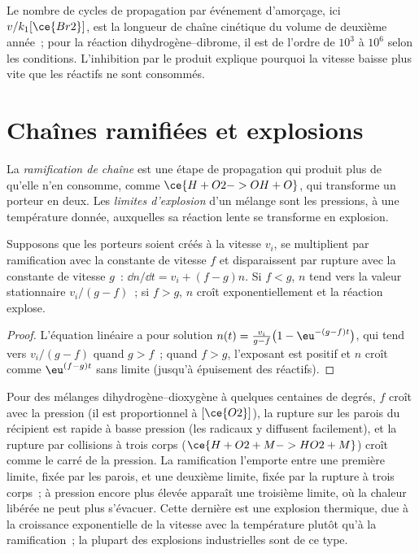 Le nombre de cycles de propagation par événement d'amorçage, ici
$v/k_1[\ce{Br2}]$, est la longueur de chaîne cinétique du volume de
deuxième année~; pour la réaction dihydrogène--dibrome, il est de
l'ordre de $10^3$ à $10^6$ selon les conditions. L'inhibition par le
produit explique pourquoi la vitesse baisse plus vite que les réactifs
ne sont consommés.

\section{Chaînes ramifiées et explosions}

\begin{definition}\label{def:b3:complex-kinetics:branching}
La \emph{ramification de chaîne} est une étape de
propagation qui produit plus de  qu'elle n'en consomme,
comme $\ce{H + O2 -> OH + O}$, qui transforme un porteur en deux. Les
\emph{limites d'explosion} d'un mélange sont
les pressions, à une température donnée, auxquelles sa réaction lente se
transforme en explosion.
\end{definition}

\begin{proposition}\label{prop:b3:complex-kinetics:branching}
Supposons que les porteurs soient créés à la vitesse $v_i$, se
multiplient par ramification avec la constante de vitesse $f$ et
disparaissent par rupture avec la constante de vitesse $g$~:
$\dd n/\dd t = v_i + (f - g)n$. Si $f < g$, $n$ tend vers la valeur
stationnaire $v_i/(g - f)$~; si
$f > g$, $n$ croît exponentiellement et la réaction explose.
\end{proposition}

\begin{proof}
L'équation linéaire a pour solution $n(t) = \frac{v_i}{g - f}\bigl(1 - \eu^{-(g - f)t}\bigr)$, qui
tend vers $v_i/(g - f)$ quand $g > f$~; quand $f > g$, l'exposant est
positif et $n$
croît comme $\eu^{(f - g)t}$ sans limite (jusqu'à épuisement des
réactifs).
\end{proof}

Pour des mélanges dihydrogène--dioxygène à quelques centaines de degrés,
$f$ croît avec la pression (il est proportionnel à $[\ce{O2}]$), la
rupture sur les parois du récipient est rapide à basse pression (les
radicaux y diffusent facilement), et la rupture par collisions à trois
corps ($\ce{H + O2 + M -> HO2 + M}$) croît comme le carré
de la pression. La ramification l'emporte entre une première limite,
fixée par les parois, et une deuxième limite, fixée par la rupture à
trois corps~; à pression encore plus élevée apparaît une troisième
limite, où la chaleur libérée ne peut plus s'évacuer. Cette dernière est
une explosion thermique, due à la croissance exponentielle de la
vitesse avec la température plutôt qu'à la ramification~; la plupart
des explosions industrielles sont de ce type.

